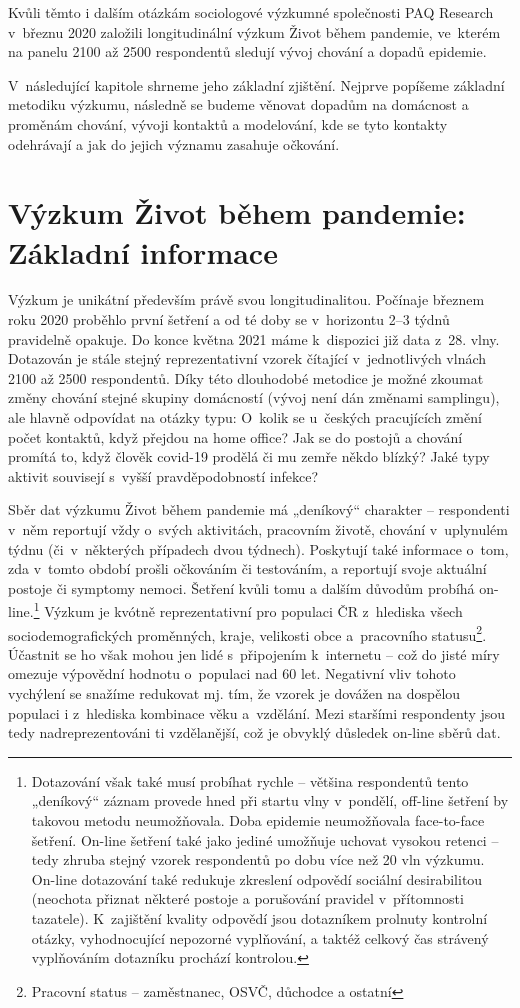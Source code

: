 Kvůli těmto i dalším otázkám sociologové výzkumné společnosti PAQ Research v březnu 2020 založili longitudinální výzkum Život během pandemie, ve kterém na panelu 2100 až 2500 respondentů sledují vývoj chování a dopadů epidemie.

V následující kapitole shrneme jeho základní zjištění. Nejprve popíšeme základní metodiku výzkumu, následně se budeme věnovat dopadům na domácnost a proměnám chování, vývoji kontaktů a modelování, kde se tyto kontakty odehrávají a jak do jejich významu zasahuje očkování.

\section*{Výzkum Život během pandemie: Základní informace}

Výzkum je unikátní především právě svou longitudinalitou. Počínaje březnem roku 2020 proběhlo první šetření a od té doby se v horizontu 2–3 týdnů pravidelně opakuje. Do konce května 2021 máme k dispozici již data z 28. vlny. Dotazován je stále stejný reprezentativní vzorek čítající v jednotlivých vlnách 2100 až 2500 respondentů. Díky této dlouhodobé metodice je možné zkoumat změny chování stejné skupiny domácností (vývoj není dán změnami samplingu), ale hlavně odpovídat na otázky typu: O~kolik se u~českých pracujících změní počet kontaktů, když přejdou na home office? Jak se do postojů a chování promítá to, když člověk covid-19 prodělá či mu zemře někdo blízký? Jaké typy aktivit souvisejí s vyšší pravděpodobností infekce?

Sběr dat výzkumu Život během pandemie má „deníkový“ charakter – respondenti v něm reportují vždy o~svých aktivitách, pracovním životě, chování v uplynulém týdnu (či v některých případech dvou týdnech). Poskytují také informace o~tom, zda v tomto období prošli očkováním či testováním, a reportují svoje aktuální postoje či symptomy nemoci. Šetření kvůli tomu a dalším důvodům probíhá on-line.\footnote{Dotazování však také musí probíhat rychle – většina respondentů tento „deníkový“ záznam provede hned při startu vlny v pondělí, off-line šetření by takovou metodu neumožňovala. Doba epidemie neumožňovala face-to-face šetření. On-line šetření také jako jediné umožňuje uchovat vysokou retenci – tedy zhruba stejný vzorek respondentů po dobu více než 20 vln výzkumu. On-line dotazování také redukuje zkreslení odpovědí sociální desirabilitou (neochota přiznat některé postoje a porušování pravidel v přítomnosti tazatele). K~zajištění kvality odpovědí jsou dotazníkem prolnuty kontrolní otázky, vyhodnocující nepozorné vyplňování, a taktéž celkový čas strávený vyplňováním dotazníku prochází kontrolou. } Výzkum je kvótně reprezentativní pro populaci ČR z hlediska všech sociodemografických proměnných, kraje, velikosti obce a pracovního statusu\footnote{Pracovní status – zaměstnanec, OSVČ, důchodce a ostatní}. Účastnit se ho však mohou jen lidé s~připojením k internetu – což do jisté míry omezuje výpovědní hodnotu o~populaci nad 60 let. Negativní vliv tohoto vychýlení se snažíme redukovat mj. tím, že vzorek je dovážen na dospělou populaci i z hlediska kombinace věku a vzdělání. Mezi staršími respondenty jsou tedy nadreprezentováni ti vzdělanější, což je obvyklý důsledek on-line sběrů dat.


